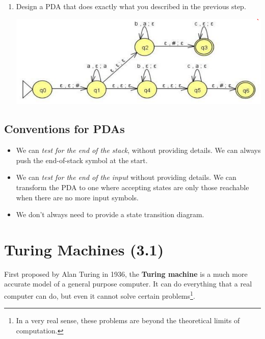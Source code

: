 \documentclass[letterpaper]{article}
\begin{document}
\begin{enumerate}
    \item Design a PDA that does exactly what you described in the previous step. 
    \begin{mdframed}[nobreak=true]
        \begin{center}
            \includegraphics[scale=0.6]{assets/pda_2.png}
        \end{center}
    \end{mdframed}
\end{enumerate}


\subsection{Conventions for PDAs}
\begin{itemize}
    \item We can \emph{test for the end of the stack}, without providing details. We can always push the end-of-stack symbol \code{\$} at the start. 
    \item We can \emph{test for the end of the input} without providing details. We can transform the PDA to one where accepting states are only those reachable when there are no more input symbols. 
    \item We don't always need to provide a state transition diagram.
\end{itemize}









\newpage 
\section{Turing Machines (3.1)}
First proposed by Alan Turing in 1936, the \textbf{Turing machine} is a much more accurate model of a general purpose computer. It can do everything that a real computer can do, but even it cannot solve certain problems\footnote{In a very real sense, these problems are beyond the theoretical limits of computation.}.
\end{document}
